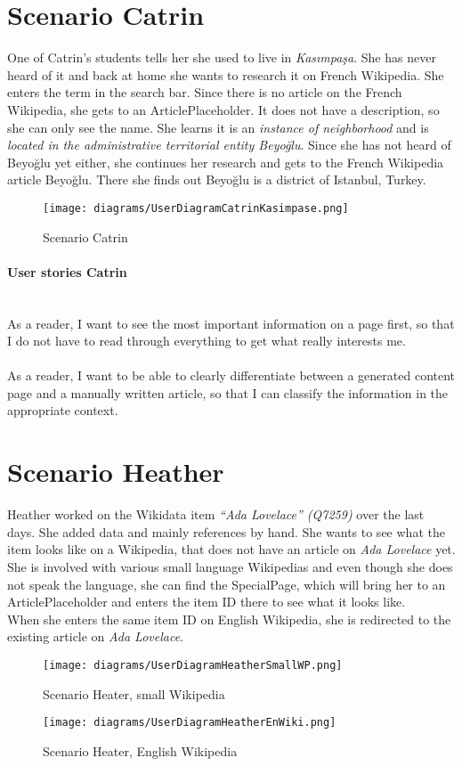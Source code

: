 \section{Scenario Catrin}
One of Catrin's students tells her she used to live in \textit{Kasımpaşa}. She has never heard of it and back at home she wants to research it on French Wikipedia. She enters the term in the search bar. Since there is no article on the French Wikipedia, she gets to an ArticlePlaceholder. It does not have a description, so she can only see the name. She learns it is an \textit{instance of neighborhood} and is \textit{located in the administrative territorial entity Beyoğlu}. Since she has not heard of Beyoğlu yet either, she continues her research and gets to the French Wikipedia article Beyoğlu. There she finds out Beyoğlu is a district of Istanbul, Turkey.
\begin{figure}[H]
	\centering
	\texttt{[image: diagrams/UserDiagramCatrinKasimpase.png]}
	\caption{Scenario Catrin}
	\label{fig:ScenarioCartin}
\end{figure}

\paragraph{User stories Catrin} ~\\
As a reader, I want to see the most important information on a page first, so that I do not have to read through everything to get what really interests me. \\
\\
As a reader, I want to be able to clearly differentiate between a generated content page and a manually written article, so that I can classify the information in the appropriate context.

\section{Scenario Heather}
Heather worked on the Wikidata item \textit{``Ada Lovelace'' (Q7259)} over the last days. She added data and mainly references by hand. She wants to see what the item looks like on a Wikipedia, that does not have an article on \textit{Ada Lovelace} yet. \\
She is involved with various small language Wikipedias and even though she does not speak the language, she can find the SpecialPage, which will bring her to an ArticlePlaceholder and enters the item ID there to see what it looks like. \\
When she enters the same item ID on English Wikipedia, she is redirected to the existing article on \textit{Ada Lovelace}.
\begin{figure}[H]
	\centering
	\texttt{[image: diagrams/UserDiagramHeatherSmallWP.png]}
	\caption{Scenario Heater, small Wikipedia}
	\label{fig:ScenarioHeatherSmall}
\end{figure}
\begin{figure}[H]
	\centering
	\texttt{[image: diagrams/UserDiagramHeatherEnWiki.png]}
	\caption{Scenario Heater, English Wikipedia}
	\label{fig:ScenarioHeatherEnWiki}
\end{figure}

